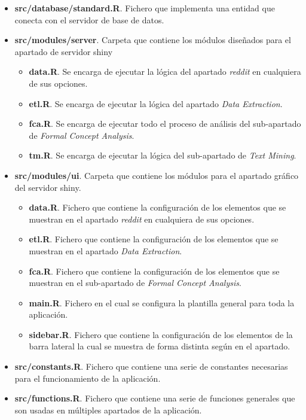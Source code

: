 \documentclass[../../main.tex]{subfiles}
\begin{document}
\begin{itemize}
    \item \textbf{src/database/standard.R}. Fichero que implementa una entidad que conecta con el servidor de base de datos.
    \item \textbf{src/modules/server}. Carpeta que contiene los módulos diseñados para el apartado de servidor \Gls{shiny}
    \begin{itemize}
        \item \textbf{data.R}. Se encarga de ejecutar la lógica del apartado \textit{\Gls{reddit}} en cualquiera de sus opciones.
        \item \textbf{etl.R}. Se encarga de ejecutar la lógica del apartado \textit{Data Extraction}.
        \item \textbf{fca.R}. Se encarga de ejecutar todo el proceso de análisis del sub-apartado de \textit{Formal Concept Analysis}.
        \item \textbf{tm.R}. Se encarga de ejecutar la lógica del sub-apartado de \textit{Text Mining}.
    \end{itemize}
    \item \textbf{src/modules/ui}. Carpeta que contiene los módulos para el apartado gráfico del servidor \Gls{shiny}.
    \begin{itemize}
        \item \textbf{data.R}. Fichero que contiene la configuración de los elementos que se muestran en el apartado \textit{\Gls{reddit}} en cualquiera de sus opciones.
        \item \textbf{etl.R}. Fichero que contiene la configuración de los elementos que se muestran en el apartado \textit{Data Extraction}.
        \item \textbf{fca.R}. Fichero que contiene la configuración de los elementos que se muestran en el sub-apartado de \textit{Formal Concept Analysis}.
        \item \textbf{main.R}. Fichero en el cual se configura la plantilla general para toda la aplicación.
        \item \textbf{sidebar.R}. Fichero que contiene la configuración de los elementos de la barra lateral la cual se muestra de forma distinta según en el apartado.
    \end{itemize}
    \item \textbf{src/constants.R}. Fichero que contiene una serie de constantes necesarias para el funcionamiento de la aplicación.
    \item \textbf{src/functions.R}. Fichero que contiene una serie de funciones generales que son usadas en múltiples apartados de la aplicación.

\end{itemize}
\end{document}
